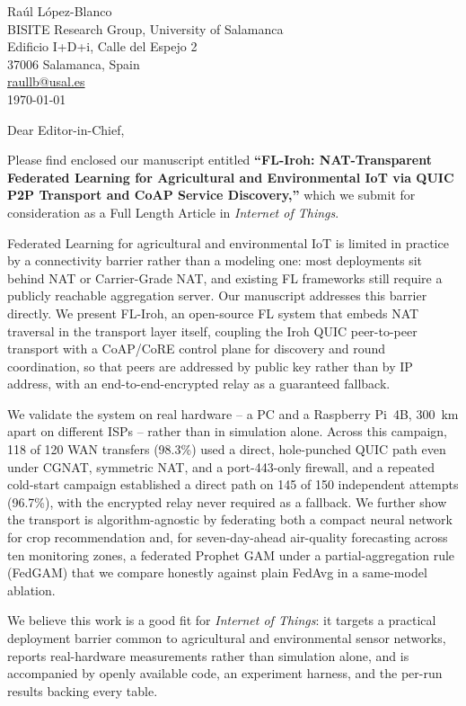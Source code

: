 \documentclass[11pt]{article}
\begin{document}
\begin{flushright}
Ra\'ul L\'opez-Blanco\\
BISITE Research Group, University of Salamanca\\
Edificio I+D+i, Calle del Espejo 2\\
37006 Salamanca, Spain\\
\href{mailto:raullb@usal.es}{raullb@usal.es}\\
\today
\end{flushright}

\vspace{1em}
Dear Editor-in-Chief,

\vspace{1em}
Please find enclosed our manuscript entitled \textbf{``FL-Iroh: NAT-Transparent Federated Learning for Agricultural and Environmental IoT via QUIC P2P Transport and CoAP Service Discovery,''} which we submit for consideration as a Full Length Article in \emph{Internet of Things}.

Federated Learning for agricultural and environmental IoT is limited in practice by a connectivity barrier rather than a modeling one: most deployments sit behind NAT or Carrier-Grade NAT, and existing FL frameworks still require a publicly reachable aggregation server. Our manuscript addresses this barrier directly. We present FL-Iroh, an open-source FL system that embeds NAT traversal in the transport layer itself, coupling the Iroh QUIC peer-to-peer transport with a CoAP/CoRE control plane for discovery and round coordination, so that peers are addressed by public key rather than by IP address, with an end-to-end-encrypted relay as a guaranteed fallback.

We validate the system on real hardware -- a PC and a Raspberry Pi~4B, 300~km apart on different ISPs -- rather than in simulation alone. Across this campaign, 118 of 120 WAN transfers (98.3\%) used a direct, hole-punched QUIC path even under CGNAT, symmetric NAT, and a port-443-only firewall, and a repeated cold-start campaign established a direct path on 145 of 150 independent attempts (96.7\%), with the encrypted relay never required as a fallback. We further show the transport is algorithm-agnostic by federating both a compact neural network for crop recommendation and, for seven-day-ahead air-quality forecasting across ten monitoring zones, a federated Prophet GAM under a partial-aggregation rule (FedGAM) that we compare honestly against plain FedAvg in a same-model ablation.

We believe this work is a good fit for \emph{Internet of Things}: it targets a practical deployment barrier common to agricultural and environmental sensor networks, reports real-hardware measurements rather than simulation alone, and is accompanied by openly available code, an experiment harness, and the per-run results backing every table.
\end{document}

